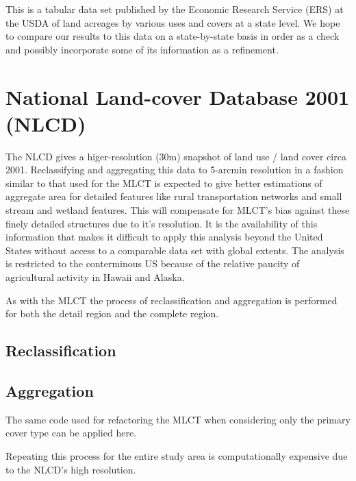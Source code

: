 This is a tabular data set published by the Economic Research Service
(ERS) at the USDA of land acreages by various uses and covers at a
state level.  We hope to compare our results to this data on a
state-by-state basis in order as a check and possibly incorporate some
of its information as a refinement.


\section{National Land-cover Database 2001 (NLCD)}
\label{sec:nlcd}

\citet{Homer2004}


The NLCD gives a higer-resolution (30m) snapshot of land use / land
cover circa 2001.    Reclassifying and aggregating this
data to 5-arcmin resolution in a fashion similar to that used for the
MLCT is expected to give better estimations of aggregate area for
detailed features like rural transportation networks and small stream
and wetland features.  This will compensate for MLCT's bias against
these finely detailed structures due to it's resolution.  It is the
availability of this information that makes it difficult to apply this
analysis beyond the United States without access to a comparable data
set with global extents.  The analysis is restricted to the
conterminous US because of the relative paucity of agricultural
activity in Hawaii and Alaska.

As with the MLCT the process of reclassification and aggregation is
performed for both the detail region and the complete region.

\subsection{Reclassification}
\label{sec:nlcd-reclass}



\subsection{Aggregation}
\label{sec:nlcd-aggr}

The same code used for refactoring the MLCT when considering only the
primary cover type can be applied here.

Repeating this process for the entire study area is computationally
expensive due to the NLCD's high resolution.


